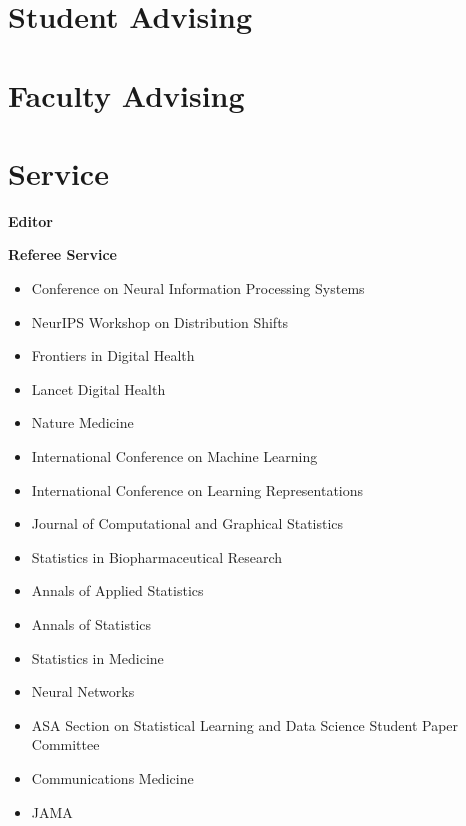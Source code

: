 \documentclass[11pt,a4paper,sans]{moderncv}        %
\begin{document}
\section{Student Advising}

\section{Faculty Advising}

\section{Service}
\textbf{Editor}


\textbf{Referee Service}
\begin{itemize}
	\item Conference on Neural Information Processing Systems %
	\item NeurIPS Workshop on Distribution Shifts %
	\item Frontiers in Digital Health %
	\item Lancet Digital Health %
	\item Nature Medicine %
        \item International Conference on Machine Learning %
        \item International Conference on Learning Representations %
	\item Journal of Computational and Graphical Statistics %
	\item Statistics in Biopharmaceutical Research %
	\item Annals of Applied Statistics %
	\item Annals of Statistics %
	\item Statistics in Medicine %
	\item Neural Networks %
	\item ASA Section on Statistical Learning and Data Science Student Paper Committee %
	\item Communications Medicine %
	\item JAMA
\end{itemize}
\end{document}
